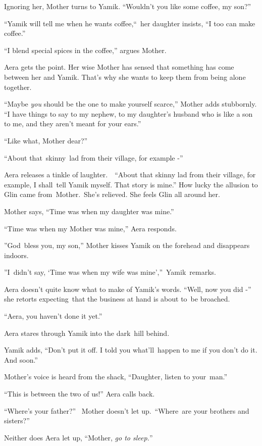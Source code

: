 \documentclass[twoside,11pt]{book}
\begin{document}
Ignoring her, Mother turns to Yamik. {}``Wouldn't you like some coffee, my son?''\ 

{}``Yamik will tell me when he wants coffee,``\ her daughter insists, ``I too can make
coffee.''

{}``I blend special spices in the coffee,'' argues Mother. 

Aera gets the point. Her wise Mother has sensed that something has come between her and Yamik. That's why she wants to
keep them from being alone together. 

{}``Maybe \textit{you} should be the one to make yourself scarce,'' Mother adds stubbornly. ``I have things to say to my
nephew, to my daughter's husband who is like a son to me, and they aren't meant for your ears.'' 

{}``Like what, Mother dear?'' 

{}``About that\ skinny{\ }lad from their village, for example -{}'' 

Aera releases a tinkle of laughter.\ ~``About that skinny lad from their village, for example, I shall~tell Yamik
myself. That story is mine.'' How lucky the allusion to Glin came from\ Mother.\ She{}'s relieved. She feels Glin all
around her. 

Mother says, ``Time was when my daughter was mine.'' 

 ``Time was when my Mother was mine,{}'' Aera responds.

{}''God\ bless you, my son,'' Mother kisses Yamik on the forehead and disappears indoors.

{}''I\ didn't say, `Time was when my wife was mine',{}''\ Yamik\ remarks.

Aera doesn't quite know what to make of Yamik's words. ``Well, now you did{
-}{}'' she retorts expecting\ that the business at hand is about to~be broached. 

{}``Aera, you haven't done it yet.''~ 

Aera stares through Yamik into the dark\ hill behind. 

Yamik adds, {}``Don't put it off. I told you what{}'ll\ happen to me if you don't do it. And soon.'' 

Mother's voice is heard from the shack, ``Daughter, listen to your~man.'' 

``This is between the two of us!'' Aera calls back.

{}``Where's your father?'' ~Mother doesn't let up.\ ``Where{\ }are your
brothers and sisters?'' 

Neither does Aera let up, ``Mother, \textit{go to sleep.}{}'' 
\end{document}
